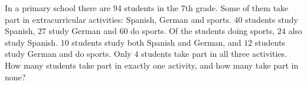In a primary school there are $94$ students in the $7$th grade. Some of them take part in extracurricular activities: Spanish, German and sports. $40$ students study Spanish, $27$ study German and $60$ do sports. Of the students doing sports, $24$ also study Spanish. $10$ students study both Spanish and German, and $12$ students study German and do sports. Only $4$ students take part in all three activities. How many students take part in exactly one activity, and how many take part in none?
